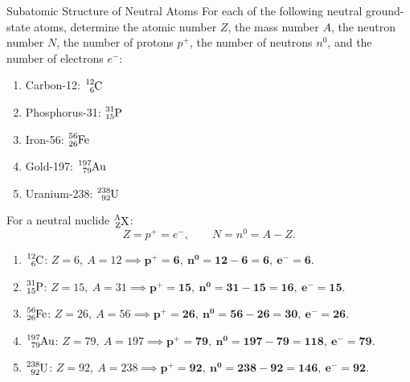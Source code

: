 \vspace{10pt}

\begin{exercise}{Subatomic Structure of Neutral Atoms}
For each of the following neutral ground-state atoms, determine the atomic number $Z$, the mass number $A$, the neutron number $N$, the number of protons $p^+$, the number of neutrons $n^0$, and the number of electrons $e^-$:
\begin{enumerate}[leftmargin=1.5em,itemsep=2pt]
  \item Carbon-12: $\ce{^{12}_{6}C}$
  \item Phosphorus-31: $\ce{^{31}_{15}P}$
  \item Iron-56: $\ce{^{56}_{26}Fe}$
  \item Gold-197: $\ce{^{197}_{79}Au}$
  \item Uranium-238: $\ce{^{238}_{92}U}$
\end{enumerate}
\end{exercise}

\begin{tabletworkspace}[5.0cm]
\end{tabletworkspace}

\begin{solution}
For a neutral nuclide $\ce{^{A}_{Z}X}$:
\[
Z = p^+ = e^-, \qquad N = n^0 = A - Z.
\]
\begin{enumerate}[leftmargin=1.5em,itemsep=2pt]
  \item $\ce{^{12}_{6}C}$: $Z = 6,\ A = 12 \implies \mathbf{p^+ = 6},\ \mathbf{n^0 = 12 - 6 = 6},\ \mathbf{e^- = 6}$.
  \item $\ce{^{31}_{15}P}$: $Z = 15,\ A = 31 \implies \mathbf{p^+ = 15},\ \mathbf{n^0 = 31 - 15 = 16},\ \mathbf{e^- = 15}$.
  \item $\ce{^{56}_{26}Fe}$: $Z = 26,\ A = 56 \implies \mathbf{p^+ = 26},\ \mathbf{n^0 = 56 - 26 = 30},\ \mathbf{e^- = 26}$.
  \item $\ce{^{197}_{79}Au}$: $Z = 79,\ A = 197 \implies \mathbf{p^+ = 79},\ \mathbf{n^0 = 197 - 79 = 118},\ \mathbf{e^- = 79}$.
  \item $\ce{^{238}_{92}U}$: $Z = 92,\ A = 238 \implies \mathbf{p^+ = 92},\ \mathbf{n^0 = 238 - 92 = 146},\ \mathbf{e^- = 92}$.
\end{enumerate}
\end{solution}

